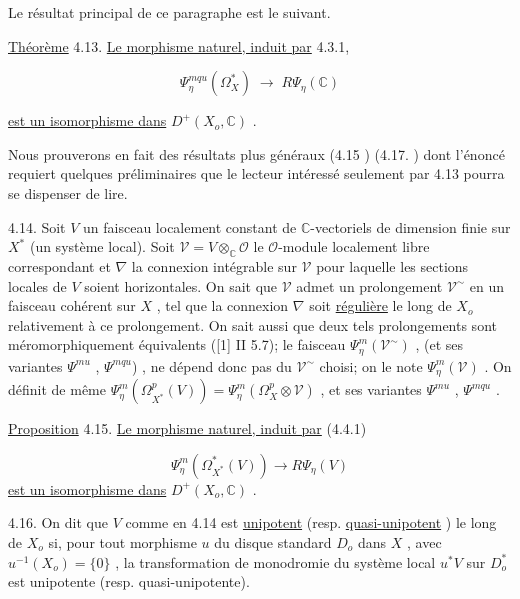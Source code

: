 Le résultat principal de ce paragraphe est le suivant.

\underline{Théorème} 4.13. \underline{Le morphisme naturel, induit par} 4.3.1,

\begin{equation}\tag{4.13.1}
\Psi^{mqu}_\eta(\Omega^*_X) \; \longrightarrow \; R\Psi_\eta(\mathbb{C}) 
\end{equation}


 \underline{est un isomorphisme dans} $D^+(X_o, \mathbb{C})$ .

Nous prouverons en fait des résultats plus généraux (4.15  ) (4.17.  ) dont l'énoncé requiert quelques préliminaires que le lecteur intéressé seulement par 4.13 pourra se dispenser de lire.

4.14. Soit $V$ un faisceau localement constant de $\mathbb{C}$-vectoriels de dimension finie sur $X^*$ (un système local). Soit $\mathcal{V} = V \otimes_{\mathbb{C}} \mathcal{O}$ le $\mathcal{O}$-module localement libre correspondant et $\nabla$ la connexion intégrable sur $\mathcal{V}$ pour laquelle les sections locales de $V$ soient horizontales. On sait que $\mathcal{V}$ admet un prolongement $\mathcal{V}^\sim$ en un faisceau cohérent sur $X$ , tel que la connexion $\nabla$ soit \underline{régulière} le long de $X_o$ relativement à ce prolongement. On sait aussi que deux tels prolongements sont méromorphiquement équivalents ([1] II 5.7); le faisceau $\Psi^m_\eta(\mathcal{V}^\sim)$ , (et ses variantes $\Psi^{mu}$ , $\Psi^{mqu}$) , ne dépend donc pas du $\mathcal{V}^\sim$ choisi; on le note $\Psi^m_\eta(\mathcal{V})$ . On définit de même $\Psi^m_\eta(\Omega^p_{X^*}(V)) = \Psi^m_\eta(\Omega^p_X \otimes \mathcal{V})$ , et ses variantes $\Psi^{mu}$ , $\Psi^{mqu}$ .

\underline{Proposition} 4.15. \underline{Le morphisme naturel, induit par} (4.4.1)

\begin{equation}\tag{4.15.1}
\Psi^m_\eta(\Omega^*_{X^*}(V)) \longrightarrow R\Psi_\eta(V)
\end{equation}
\underline{est un isomorphisme dans} $D^+(X_o, \mathbb{C})$ .

4.16. On dit que $V$ comme en 4.14 est \underline{unipotent} (resp. \underline{quasi-unipotent} ) le long de $X_o$ si, pour tout morphisme $u$ du disque standard $D_o$ dans $X$ , avec $u^{-1}(X_o) = \{0\}$ , la transformation de monodromie du système local $u^*V$ sur $D_o^*$ est unipotente (resp. quasi-unipotente).

